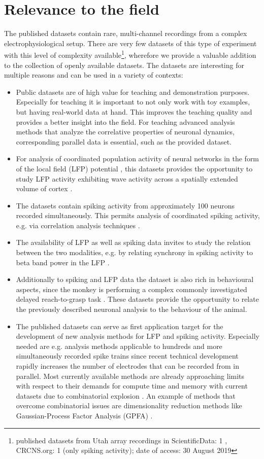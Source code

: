\section{Relevance to the field}
The published datasets contain rare, multi-channel recordings from a complex electrophysiological setup. There are very few datasets of this type of experiment with this level of complexity available\footnote{published datasets from Utah array recordings in ScientificData: 1 \citep{Brochier_2018}, CRCNS.org: 1 (only spiking activity); date of access: 30 August 2019}, wherefore we provide a valuable addition to the collection of openly available datasets. The datasets are interesting for multiple reasons and can be used in a variety of contexts:
\begin{itemize}
 \item Public datasets are of high value for teaching and demonstration purposes. Especially for teaching it is important to not only work with toy examples, but having real-world data at hand. This improves the teaching quality and provides a better insight into the field. For teaching advanced analysis methods that analyze the correlative properties of neuronal dynamics, corresponding parallel data is essential, such as the provided dataset.
 \item For analysis of coordinated population activity of neural networks in the form of the local field (LFP) potential \citep{Mitzdorf_1985, Logothetis_2004, Einevoll_2013}, this datasets provides the opportunity to study LFP activity exhibiting wave activity across a spatially extended volume of cortex \citep{Denker_2018}.
 \item The datasets contain spiking activity from approximately 100 neurons recorded simultaneously. This permits analysis of coordinated spiking activity, e.g. via correlation analysis techniques \citep{Torre_2016, Torre_2016a, Quaglio_2017, Quaglio_2018}.
 \item The availability of LFP as well as spiking data invites to study the relation between the two modalities, e.g. by relating synchrony in spiking activity to beta band power in the LFP \citep{Denker_2011}.
 \item Additionally to spiking and LFP data the dataset is also rich in behavioural aspects, since the monkey is performing a complex commonly investigated delayed reach-to-grasp task \citep{Smeets_2019,Runnarong_2019}. These datasets provide the opportunity to relate the previously described neuronal analysis to the behaviour of the animal.
 \item The published datasets can serve as first application target for the development of new analysis methods for LFP and spiking activity. Especially needed are e.g. analysis methods applicable to hundreds and more simultaneously recorded spike trains since recent technical development rapidly increases the number of electrodes that can be recorded from in parallel. Most currently available methods are already approaching limits with respect to their demands for compute time and memory with current datasets due to combinatorial explosion \citep{Seo_2015,Jun_2017}. An example of methods that overcome combinatorial issues are dimensionality reduction methods like Gaussian-Process Factor Analysis (GPFA) \citep{Yu_2009}. 

\end{itemize}
